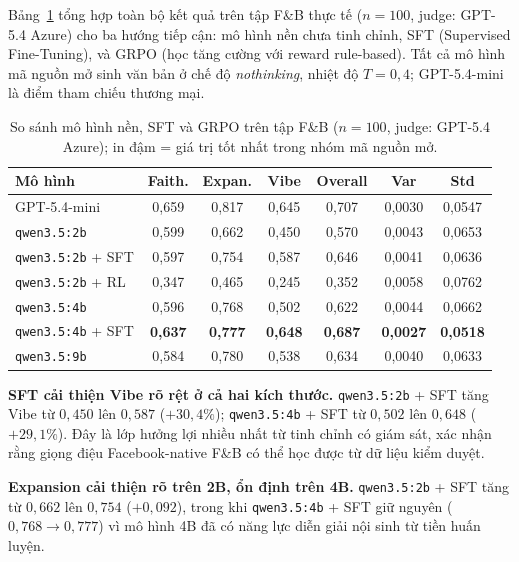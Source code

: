 Bảng~\ref{tab:final-comparison} tổng hợp toàn bộ kết quả trên tập
F\&B thực tế ($n = 100$, judge: GPT-5.4 Azure) cho ba hướng tiếp cận:
mô hình nền chưa tinh chỉnh, SFT (Supervised Fine-Tuning), và GRPO
(học tăng cường với reward rule-based). Tất cả mô hình mã nguồn mở
sinh văn bản ở chế độ \emph{nothinking}, nhiệt độ $T = 0{,}4$; GPT-5.4-mini
là điểm tham chiếu thương mại.

\begin{table}[htbp]
  \centering
  \small
  \setlength{\tabcolsep}{4pt}
  \caption{So sánh mô hình nền, SFT và GRPO trên tập F\&B ($n=100$, judge: GPT-5.4 Azure); in đậm = giá trị tốt nhất trong nhóm mã nguồn mở.}
  \label{tab:final-comparison}
  \begin{tabular}{lcccccc}
    \toprule
    \textbf{Mô hình} & \textbf{Faith.} & \textbf{Expan.}
      & \textbf{Vibe} & \textbf{Overall} & \textbf{Var} & \textbf{Std} \\
    \midrule
    GPT-5.4-mini
      & 0,659 & 0,817 & 0,645 & 0,707 & 0,0030 & 0,0547 \\
    \midrule
    \texttt{qwen3.5:2b}
      & 0,599 & 0,662 & 0,450 & 0,570 & 0,0043 & 0,0653 \\
    \texttt{qwen3.5:2b} + SFT
      & 0,597 & 0,754 & 0,587 & 0,646 & 0,0041 & 0,0636 \\
    \texttt{qwen3.5:2b} + RL
      & 0,347 & 0,465 & 0,245 & 0,352 & 0,0058 & 0,0762 \\
    \texttt{qwen3.5:4b}
      & 0,596 & 0,768 & 0,502 & 0,622 & 0,0044 & 0,0662 \\
    \texttt{qwen3.5:4b} + SFT
      & \textbf{0,637} & \textbf{0,777} & \textbf{0,648} & \textbf{0,687} & \textbf{0,0027} & \textbf{0,0518} \\
    \midrule
    \texttt{qwen3.5:9b}
      & 0,584 & 0,780 & 0,538 & 0,634 & 0,0040 & 0,0633 \\
    \bottomrule
  \end{tabular}
\end{table}

\textbf{SFT cải thiện Vibe rõ rệt ở cả hai kích thước.}
\texttt{qwen3.5:2b} + SFT tăng Vibe từ $0{,}450$ lên $0{,}587$ ($+30{,}4\%$);
\texttt{qwen3.5:4b} + SFT từ $0{,}502$ lên $0{,}648$ ($+29{,}1\%$). Đây là
lớp hưởng lợi nhiều nhất từ tinh chỉnh có giám sát, xác nhận rằng
giọng điệu Facebook-native F\&B có thể học được từ dữ liệu kiểm duyệt.

\textbf{Expansion cải thiện rõ trên 2B, ổn định trên 4B.}
\texttt{qwen3.5:2b} + SFT tăng từ $0{,}662$ lên $0{,}754$ ($+0{,}092$), trong
khi \texttt{qwen3.5:4b} + SFT giữ nguyên ($0{,}768 \to 0{,}777$) vì mô
hình 4B đã có năng lực diễn giải nội sinh từ tiền huấn luyện.

